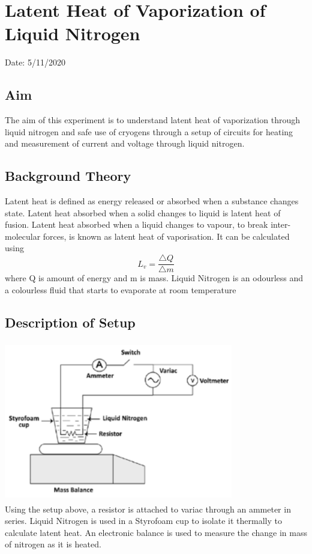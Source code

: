\chapter{Latent Heat of Vaporization of Liquid Nitrogen}

Date: 5/11/2020

\section{Aim}
The aim of this experiment is to understand latent heat of vaporization through liquid nitrogen and safe use of cryogens through a setup of circuits for heating and measurement of current and voltage through liquid nitrogen. 


\section{Background Theory}

Latent heat is defined as energy released or absorbed when a substance changes state. Latent heat absorbed when a solid changes to liquid is latent heat of fusion. Latent heat absorbed when a liquid changes to vapour, to break inter-molecular forces, is known as latent heat of vaporisation. It can be calculated using 
$$ L_v = \frac{\triangle Q}{\triangle m}$$ 
where Q is amount of energy and m is mass. 
Liquid Nitrogen is an odourless and a colourless fluid that starts to evaporate at room temperature


\section{Description of Setup}
\includegraphics[width=10cm, height=7cm]{figures/image.png} \\
Using the setup above, a resistor is attached to variac through an ammeter in series. Liquid Nitrogen is used in a Styrofoam cup to isolate it thermally to calculate latent heat. An electronic balance is used to measure the change in mass of nitrogen as it is heated.  


